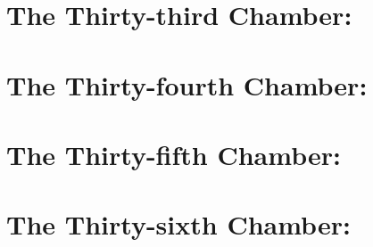 \documentclass{book}[9pt]
\begin{document}
\chapter{The Thirty-third Chamber: }

\chapter{The Thirty-fourth Chamber: }

\chapter{The Thirty-fifth Chamber: }

\chapter{The Thirty-sixth Chamber: }


\backmatter
\end{document}
